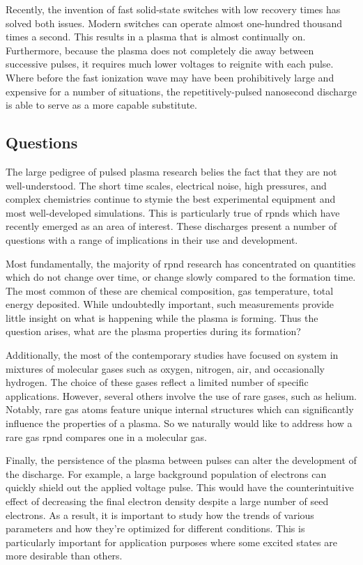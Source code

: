 Recently, the invention of fast solid-state switches with low recovery times has
solved both issues. Modern switches can operate almost one-hundred thousand
times a second. This results in a plasma that is almost continually on.
Furthermore, because the plasma does not completely die away between successive
pulses, it requires much lower voltages to reignite with each pulse. Where
before the fast ionization wave may have been prohibitively large and expensive
for a number of situations, the repetitively-pulsed nanosecond discharge is able
to serve as a more capable substitute.

\subsection{Questions}

The large pedigree of pulsed plasma research belies the fact that they are not
well-understood. The short time scales, electrical noise, high pressures, and
complex chemistries continue to stymie the best experimental equipment and most
well-developed simulations. This is particularly true of \acs{rpnd}s which have
recently emerged as an area of interest. These discharges present a number of
questions with a range of implications in their use and development.

Most fundamentally, the majority of \acs{rpnd} research has concentrated on
quantities which do not change over time, or change slowly compared to the
formation time. The most common of these are chemical composition, gas
temperature, total energy deposited. While undoubtedly important, such
measurements provide little insight on what is happening while the plasma is
forming. Thus the question arises, what are the plasma properties during its
formation?

Additionally, the most of the contemporary studies have focused on system in
mixtures of molecular gases such as oxygen, nitrogen, air, and occasionally
hydrogen. The choice of these gases reflect a limited number of specific
applications. However, several others involve the use of rare gases, such as
helium. Notably, rare gas atoms feature unique internal structures which can
significantly influence the properties of a plasma. So we naturally would like
to address how a rare gas \acs{rpnd} compares one in a molecular gas.

Finally, the persistence of the plasma between pulses can alter the development
of the discharge. For example, a large background population of electrons can
quickly shield out the applied voltage pulse. This would have the
counterintuitive effect of decreasing the final electron density despite a large
number of seed electrons. As a result, it is important to study how the trends
of various parameters and how they're optimized for different conditions. This
is particularly important for application purposes where some excited states are
more desirable than others.

